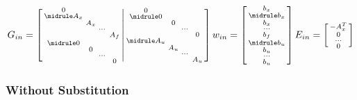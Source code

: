 \[
	G_{in} =
	\left[
		\begin{smallmatrix}
			0 & & & \\
			\midrule
			A_x & & & \\
			& A_x & & \\
			& & \cdots & \\
			& & & A_f \\
			\midrule
			0 & & & \\
			& 0 & & \\
			& & \cdots & \\
			& & & 0
		\end{smallmatrix}
		\middle|
		\begin{smallmatrix}
			0 & & & \\
			\midrule
			0 & & & \\
			& 0 & & \\
			& & \cdots & \\
			& & & 0 \\
			\midrule
			A_u & & & \\
			& A_u & & \\
			& & \cdots & \\
			& & & A_u
		\end{smallmatrix}
		\right]
	w_{in} =
	\left[
		\begin{smallmatrix}
			b_x \\
			\midrule
			b_x \\
			b_x \\
			\cdots \\
			b_f \\
			\midrule
			b_u \\
			b_u \\
			\cdots \\
			b_u \\
		\end{smallmatrix}
		\right]
	E_{in} =
	\left[
		\begin{smallmatrix}
			-A_x^T \\%
			0 \\
			\cdots \\
			0 \\
		\end{smallmatrix}
		\right]
\]



\subsubsection{Without Substitution}

